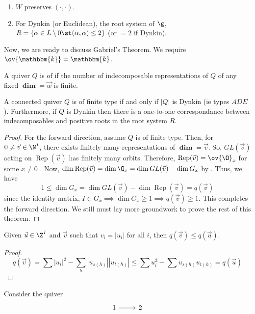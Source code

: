 \documentclass[11pt,leqno,oneside]{amsbook}
\numberwithin{thm}{section}
\newcommand{\bbk}{\mathbbm{k}} %
\newcommand{\Rep}{\operatorname{Rep}} %
\renewcommand{\Q}{Q} %
\newcommand{\grdim}{\boldsymbol{\dim}} %
\begin{document}
\begin{prop}\label{dynkin-root-system-char}
  \begin{enumerate}
  \item \(W\) preserves \((\cdot, \cdot)\).
  \item For Dynkin (or Euclidean), the root system of \(\g\), \(R =
    \{\alpha \in L \setminus 0 \st (\alpha,\alpha) \leq 2\}\) (or
    \(=2\) if Dynkin). 
  \end{enumerate}
\end{prop}
Now, we are ready to discuss Gabriel's Theorem. We require \(\ov{\bbk}
= \bbk\).
\begin{defn}
  A quiver \(\Q\) is of  if the number of
  indecomposable representations of \(\Q\) of any fixed \(\grdim = 
  \vec{w}\) is finite.
\end{defn}
\begin{thm}\label{gabriels-thm}
  A connected quiver \(\Q\) is of finite type if and only if \(|\Q|\)
  is Dynkin (ie types \(ADE\)). Furthermore, if \(\Q\) is Dynkin then
  there is a one-to-one correspondance between indecomposables and
  positive roots in the root system \(R\). 
\end{thm}
\begin{proof}
  For the forward direction, assume \(\Q\) is of finite type. Then, for
  \(0 \neq \vec{v} \in \N^I\), there exists finitely many
  representations of \(\grdim = \vec{v}\). So, \(GL(\vec{v})\) acting
  on \(\Rep(\vec{v})\) has finitely many orbits. Therefore,
  \(\Rep(\vec{v}) = \ov{\O}_x\) for some \(x \neq 0\)
  . Now, \(\dim \Rep(\vec{v}) = \dim \O_x = \dim
  GL(\vec{v}) - \dim G_x\) by . Thus, we have \[
    1 \leq \dim G_x = \dim GL(\vec{v}) - \dim \Rep(\vec{v}) = q(\vec{v})
  \]
  since the identity matrix, \(I \in G_x \implies \dim G_x \geq 1
  \implies q(\vec{v}) \geq 1\). This completes the forward
  direction. We still must lay more groundwork to prove the rest of
  this theorem.
\end{proof}
\begin{prop}
  Given \(\vec{u} \in \Z^I\) and \(\vec{v}\) such that \(v_i = |u_i|\)
  for all \(i\), then \(q(\vec{v}) \leq q(\vec{u})\). 
\end{prop}
\begin{proof}
  \[
    q(\vec{v}) = \sum |u_i|^2 - \sum_h |u_{s(h)}| |u_{t(h)}| \leq \sum
    u_i^2 - \sum u_{s(h)} u_{t(h)} = q(\vec{u})
  \]
\end{proof}
\begin{example}
  Consider the quiver \[
    \begin{tikzcd}
      1 \rar & 2
    \end{tikzcd}
  \]
\end{example} 
\end{document}

